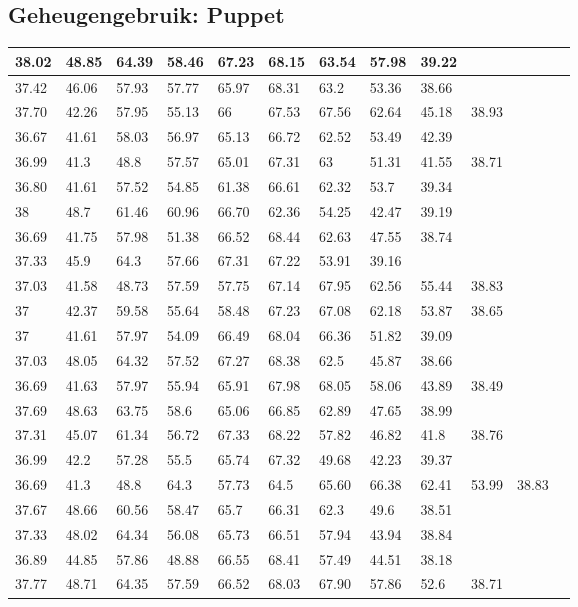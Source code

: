\subsection*{Geheugengebruik: Puppet}
\label{dataset:deploytijden:puppet}
\begin{longtable}{ | l | l | l | l | l | l | l | l | l | l | l | l }
\hline
	38.02 & 48.85 & 64.39 & 58.46 & 67.23 & 68.15 & 63.54 & 57.98 & 39.22  & &  \\ \hline
	37.42 & 46.06 & 57.93 & 57.77 & 65.97 & 68.31 & 63.2 & 53.36 & 38.66 && \\ \hline
	37.70 & 42.26 & 57.95 & 55.13 & 66 & 67.53 & 67.56 & 62.64 & 45.18 & 38.93  & \\ \hline
	36.67 & 41.61 & 58.03 & 56.97 & 65.13 & 66.72 & 62.52 & 53.49 & 42.39 && \\ \hline
	36.99 & 41.3 & 48.8 & 57.57 & 65.01 & 67.31 & 63 & 51.31 & 41.55 & 38.71 & \\ \hline
	36.80 & 41.61 & 57.52 & 54.85 & 61.38 & 66.61 & 62.32 & 53.7 & 39.34 && \\ \hline
	38 & 48.7 & 61.46 & 60.96 & 66.70 & 62.36 & 54.25 & 42.47 & 39.19 && \\ \hline
	36.69 & 41.75 & 57.98 & 51.38 & 66.52 & 68.44 & 62.63 & 47.55 & 38.74 && \\ \hline
	37.33 & 45.9 & 64.3 & 57.66 & 67.31 & 67.22 & 53.91 & 39.16 &  && \\ \hline
	37.03 & 41.58 & 48.73 & 57.59 & 57.75 & 67.14 & 67.95 & 62.56 & 55.44 & 38.83 &    \\ \hline
	37 & 42.37 & 59.58 & 55.64 & 58.48 & 67.23 & 67.08 & 62.18 & 53.87 & 38.65 & \\ \hline
	37 & 41.61 & 57.97 & 54.09 & 66.49 & 68.04 & 66.36 & 51.82 & 39.09  & &\\ \hline
	37.03 & 48.05 & 64.32 & 57.52 & 67.27 & 68.38 & 62.5 & 45.87 & 38.66  & & \\ \hline
	36.69 & 41.63 & 57.97 & 55.94 & 65.91 & 67.98 & 68.05 & 58.06 & 43.89 & 38.49  & \\ \hline
	37.69 & 48.63 & 63.75 & 58.6 & 65.06 & 66.85 & 62.89 & 47.65 & 38.99&&    \\ \hline
	37.31 & 45.07 & 61.34 & 56.72 & 67.33 & 68.22 & 57.82 & 46.82 & 41.8 & 38.76  &  \\ \hline
	36.99 & 42.2 & 57.28 & 55.5 & 65.74 & 67.32 & 49.68 & 42.23 & 39.37   &&\\ \hline
	36.69 & 41.3 & 48.8 & 64.3 & 57.73 & 64.5 & 65.60 & 66.38 & 62.41 & 53.99 & 38.83  \\ \hline
	37.67 & 48.66 & 60.56 & 58.47 & 65.7 & 66.31 & 62.3 & 49.6 & 38.51&&  \\ \hline
	37.33 & 48.02 & 64.34 & 56.08 & 65.73 & 66.51 & 57.94 & 43.94 & 38.84 &&   \\ \hline
	36.89 & 44.85 & 57.86 & 48.88 & 66.55 & 68.41 & 57.49 & 44.51 & 38.18  && \\ \hline
	37.77 & 48.71 & 64.35 & 57.59 & 66.52 & 68.03 & 67.90 & 57.86 & 52.6 & 38.71 &  \\ \hline	
\end{longtable}

